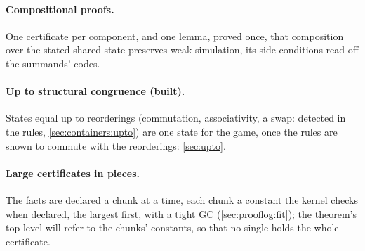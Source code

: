 \paragraph{Compositional proofs.} One certificate per component, and one
lemma, proved once, that composition over the stated shared state
preserves weak simulation, its side conditions read off the summands'
codes.

\paragraph{Up to structural congruence (built).} States equal up to
reorderings (commutation, associativity, a swap: detected in the rules,
\cref{sec:containers:upto}) are one state for the game, once the rules are
shown to commute with the reorderings: \cref{sec:upto}.

\paragraph{Large certificates in pieces.} The facts are declared a chunk
at a time, each chunk a constant the kernel checks when declared, the
largest first, with a tight GC (\cref{sec:prooflog:fit}); the theorem's
top level will refer to the chunks' constants, so that no single
 holds the whole certificate.
